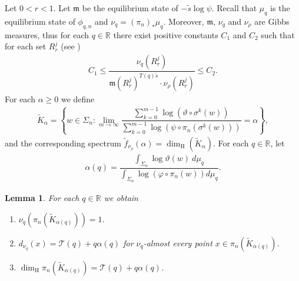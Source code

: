 \documentclass[11pt]{amsart}
\newtheorem{lemma}[theorem]{Lemma}
\theoremstyle{remark}
\numberwithin{equation}{section}
\newcommand{\R}{\mathbb{R}}
\begin{document}
 Let $0<r<1$. Let $\mathfrak{m}$ be the equilibrium state of $-\tilde{s}\log \psi$. Recall that $\mu_{q}$ is the equilibrium state of $\phi_{q,n}$ and $\nu_{q}=(\pi_{n})_{*}\mu_{q}$.  Moreover, $\mathfrak{m}$, $\nu_{q}$ and $\nu_{\rho}$ are Gibbs measures, thus for each $q\in \R$ there exist positive constants $C_{1}$ and $C_{2}$ such that for each set $R^{j}_{r}$ (see \cite[Lemma 1]{yh})
    \begin{align}\label{Ecu6}
        C_{1}\leq \dfrac{\nu_{q}(R^{j}_{r})}{\mathfrak{m}(R^{j}_{r})^{T(q)\tilde{s}}\cdot \nu_{\rho}(R^{j}_{r})}\leq C_{2}.
    \end{align} For each $\alpha\geq 0$ we define 
\begin{align*}
    \tilde{K}_{\alpha}=\left\{w\in \Sigma_{n}:\lim_{m\to \infty}\dfrac{\sum^{m-1}_{k=0}\log(\vartheta\circ \sigma^{k}(w))}{\sum^{m-1}_{k=0}\log(\psi\circ \pi_{n}(\sigma^{k}(w)))}=\alpha\right\},
\end{align*}and the corresponding spectrum $\tilde{f}_{\nu_{\rho}}(\alpha)=\dim_{\mathrm{H}}\left(\tilde{K}_{\alpha}\right)$. For each $q\in \R$, let
\begin{align*}
    \alpha(q)=\dfrac{\int_{\Sigma_{n}}\log \vartheta(w) \ d\mu_{q}}{\int_{\Sigma_{n}}\log(\varphi\circ \pi_{n}(w))d\mu_{q}}.
\end{align*} 
\begin{lemma}\label{Lemma3}
    For each $q\in \R$ we obtain
    \begin{enumerate}
        \item $\nu_{q}(\pi_{n}(\tilde{K}_{\alpha(q)}))=1$.
        \item $d_{\nu_{q}}(x)=\mathcal{T}(q)+q\alpha(q)$ for $\nu_{q}$-almost every point $x\in \pi_{n}(\tilde{K}_{\alpha(q)})$.
        \item $\dim_{\mathrm{H}}\pi_{n}(\tilde{K}_{\alpha(q)})=\mathcal{T}(q)+q\alpha(q)$.
    \end{enumerate}
\end{lemma}
\end{document}
